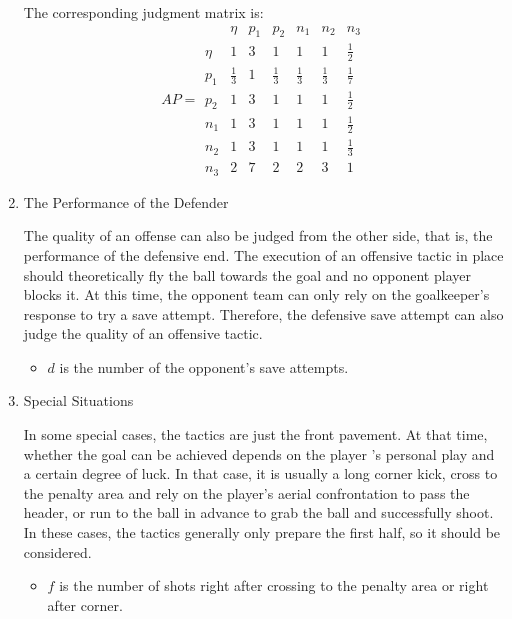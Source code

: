 \documentclass{mcmthesis}
\begin{document}
\begin{enumerate}
	\qquad The corresponding judgment matrix is:
	\begin{equation}\label{mat:1}
		AP=
 	\begin{matrix}
   		 & \eta & p_{1} & p_{2} & n_{1} & n_{2} & n_{3} \\
   		\eta & 1 & 3 & 1 & 1 & 1 & \frac{1}{2} \\
		p_{1} & \frac{1}{3} & 1 & \frac{1}{3} & \frac{1}{3} &\frac{1}{3} &\frac{1}{7}\\
		p_{2} & 1 & 3 & 1 & 1 & 1 & \frac{1}{2} \\ 
		n_{1} & 1 & 3 & 1 & 1 & 1 & \frac{1}{2} \\ 
		n_{2} & 1 & 3 & 1 & 1 & 1 & \frac{1}{3} \\
		n_{3} & 2 & 7 & 2 & 2 & 3 & 1 
		
  	\end{matrix} 
	\end{equation}
	
	\item The Performance of the Defender
	
	\qquad The quality of an offense can also be judged from the other side, that is, the performance of the defensive end. The execution of an offensive tactic in place should theoretically fly the ball towards the goal and no opponent player blocks it.  At this time, the opponent team can only rely on the goalkeeper's response to try a save attempt.  Therefore, the defensive save attempt can also judge the quality of an offensive tactic.

	\begin{itemize}
		\item $d$ is the number of the opponent's save attempts.
	\end{itemize}

	\item Special Situations
	
	\qquad In some special cases, the tactics are just the front pavement. At that time, whether the goal can be achieved depends on the player ’s personal play and a certain degree of luck. In that case, it is usually a long corner kick, cross to the penalty area and rely on the player's aerial confrontation to pass the header, or run to the ball in advance to grab the ball and successfully shoot. In these cases, the tactics generally only prepare the first half, so it should be considered.

	\begin{itemize}
		\item $f$ is the number of shots right after crossing to the penalty area or right after corner.
	\end{itemize}

	\end{enumerate}
	
\end{document}
